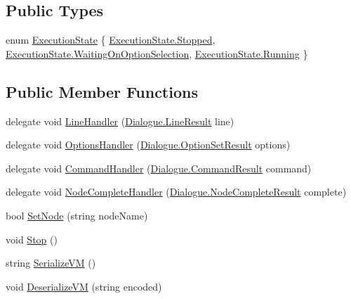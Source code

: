 \subsection*{Public Types}
\begin{DoxyCompactItemize}
\item 
enum \hyperlink{a00086_add28fa9c8a45ca579e84d05920bbc42d}{Execution\-State} \{ \hyperlink{a00086_add28fa9c8a45ca579e84d05920bbc42dac23e2b09ebe6bf4cb5e2a9abe85c0be2}{Execution\-State.\-Stopped}, 
\hyperlink{a00086_add28fa9c8a45ca579e84d05920bbc42da74a2a0b3a4597e7a50714f9cea34772b}{Execution\-State.\-Waiting\-On\-Option\-Selection}, 
\hyperlink{a00086_add28fa9c8a45ca579e84d05920bbc42da5bda814c4aedb126839228f1a3d92f09}{Execution\-State.\-Running}
 \}
\end{DoxyCompactItemize}
\subsection*{Public Member Functions}
\begin{DoxyCompactItemize}
\item 
delegate void \hyperlink{a00086_aac9ec1011ea2c01460044d7c8355f398}{Line\-Handler} (\hyperlink{a00064}{Dialogue.\-Line\-Result} line)
\item 
delegate void \hyperlink{a00086_a78dfd54b743e53078eed19ab7be2b6cf}{Options\-Handler} (\hyperlink{a00074}{Dialogue.\-Option\-Set\-Result} options)
\item 
delegate void \hyperlink{a00086_a1b57359378059b134ba76acddafd8d81}{Command\-Handler} (\hyperlink{a00041}{Dialogue.\-Command\-Result} command)
\item 
delegate void \hyperlink{a00086_a5bf3aa51578847c18191fec665a840f9}{Node\-Complete\-Handler} (\hyperlink{a00069}{Dialogue.\-Node\-Complete\-Result} complete)
\item 
bool \hyperlink{a00086_a6364593ea1115d65e34b343422cfbbbd}{Set\-Node} (string node\-Name)
\item 
void \hyperlink{a00086_a78b8c4078471af59ba505c28824d84d1}{Stop} ()
\item 
string \hyperlink{a00086_ae66d8c267611573b649233f511beb646}{Serialize\-V\-M} ()
\item 
void \hyperlink{a00086_a52055e419ba627f0788ad3f6d0f9cb1c}{Deserialize\-V\-M} (string encoded)
\end{DoxyCompactItemize}
